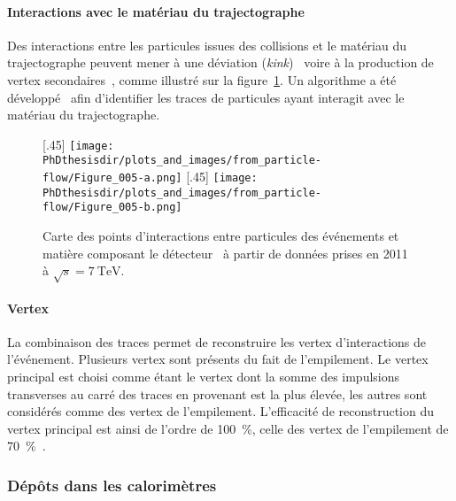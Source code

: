 \paragraph{Interactions avec le matériau du trajectographe}
Des interactions entre les particules issues des collisions et le matériau du trajectographe peuvent mener
à une déviation (\emph{kink})~\cite{moliere_scat_1,moliere_scat_2}
voire
à la production de vertex secondaires~\cite{particle-flow,CMS-TRK-17-001},
comme illustré sur la figure~\ref{fig-chapter-LHC-section-evt_reco-subsec-PF_elements-CMS-self-radio}.
Un algorithme a été développé~\cite{CMS-PAS-TRK-10-003} afin d'identifier les traces de particules ayant interagit avec le matériau du trajectographe.
\begin{figure}[h]
\centering
{}[.45\textwidth]
{\texttt{[image: \\PhDthesisdir/plots\_and\_images/from\_particle-flow/Figure\_005-a.png]}}
\hfill
{}[.45\textwidth]
{\texttt{[image: \\PhDthesisdir/plots\_and\_images/from\_particle-flow/Figure\_005-b.png]}}
\caption[Points d'interactions entre particules des événements et matière composant le détecteur.]{Carte des points d'interactions entre particules des événements et matière composant le détecteur~\cite{particle-flow,CMS-TRK-17-001} à partir de données prises en 2011 à $\sqrt{s}=\SI{7}{\TeV}$.}
\label{fig-chapter-LHC-section-evt_reco-subsec-PF_elements-CMS-self-radio}
\end{figure}
\paragraph{Vertex}
La combinaison des traces permet de reconstruire les vertex d'interactions de l'événement.
Plusieurs vertex sont présents du fait de l'empilement.
Le vertex principal est choisi comme étant le vertex dont la somme des impulsions transverses au carré des traces en provenant est la plus élevée, les autres sont considérés comme des vertex de l'empilement.
L'efficacité de reconstruction du vertex principal est ainsi de l'ordre de \SI{100}{\%}, celle des vertex de l'empilement de \SI{70}{\%}~\cite{JERC_RunI}.
\subsubsection{Dépôts dans les calorimètres}

